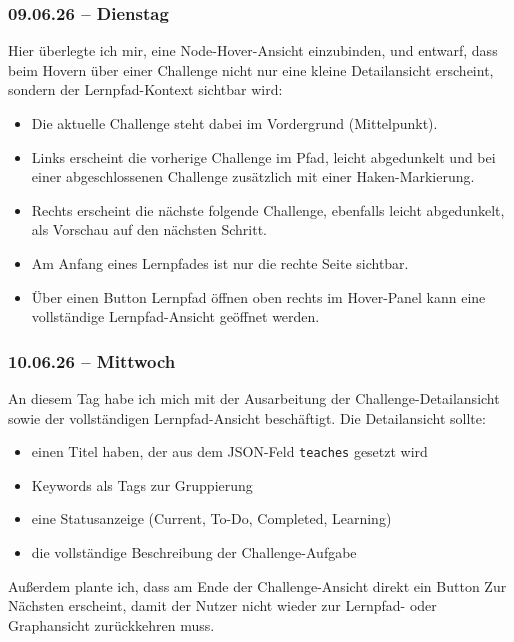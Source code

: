 \subsubsection{09.06.26 -- Dienstag}

Hier überlegte ich mir, eine Node-Hover-Ansicht einzubinden, und entwarf, dass beim
Hovern über einer Challenge nicht nur eine kleine Detailansicht erscheint, sondern der
Lernpfad-Kontext sichtbar wird:

\begin{itemize}[itemsep=2pt, topsep=4pt]
  \item Die aktuelle Challenge steht dabei im Vordergrund (Mittelpunkt).
  \item Links erscheint die vorherige Challenge im Pfad, leicht abgedunkelt und bei
        einer abgeschlossenen Challenge zusätzlich mit einer Haken-Markierung.
  \item Rechts erscheint die nächste folgende Challenge, ebenfalls leicht abgedunkelt,
        als Vorschau auf den nächsten Schritt.
  \item Am Anfang eines Lernpfades ist nur die rechte Seite sichtbar.
  \item Über einen Button \glqq Lernpfad öffnen\grqq{} oben rechts im Hover-Panel
        kann eine vollständige Lernpfad-Ansicht geöffnet werden.
\end{itemize}

\subsubsection{10.06.26 -- Mittwoch}

An diesem Tag habe ich mich mit der Ausarbeitung der Challenge-Detailansicht sowie
der vollständigen Lernpfad-Ansicht beschäftigt. Die Detailansicht sollte:

\begin{itemize}[itemsep=2pt, topsep=4pt]
  \item einen Titel haben, der aus dem JSON-Feld \texttt{teaches} gesetzt wird
  \item Keywords als Tags zur Gruppierung
  \item eine Statusanzeige (Current, To-Do, Completed, Learning)
  \item die vollständige Beschreibung der Challenge-Aufgabe
\end{itemize}
Außerdem plante ich, dass am Ende der Challenge-Ansicht direkt ein Button
\glqq Zur Nächsten\grqq{} erscheint, damit der Nutzer nicht wieder zur Lernpfad-
oder Graphansicht zurückkehren muss.

